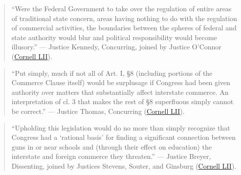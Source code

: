 \documentclass[12pt]{article}
\begin{document}
\begin{quote}
``Were the Federal Government to take over the regulation of entire areas of traditional state concern, areas having nothing to do with the regulation of commercial activities, the boundaries between the spheres of federal and state authority would blur and political responsibility would become illusory.''
--- Justice Kennedy, Concurring, joined by Justice O'Connor (\href{https://www.law.cornell.edu/supct/html/93-1260.ZC.html}{Cornell LII}).
\end{quote}

\begin{quote}
``Put simply, much if not all of Art. I, \S 8 (including portions of the Commerce Clause itself) would be surplusage if Congress had been given authority over matters that substantially affect interstate commerce. An interpretation of cl. 3 that makes the rest of \S 8 superfluous simply cannot be correct.''
--- Justice Thomas, Concurring (\href{https://www.law.cornell.edu/supct/html/93-1260.ZC1.html}{Cornell LII}).
\end{quote}

\begin{quote}
``Upholding this legislation would do no more than simply recognize that Congress had a `rational basis' for finding a significant connection between guns in or near schools and (through their effect on education) the interstate and foreign commerce they threaten.''
--- Justice Breyer, Dissenting, joined by Justices Stevens, Souter, and Ginsburg (\href{https://www.law.cornell.edu/supct/html/93-1260.ZD2.html}{Cornell LII}).
\end{quote}
\end{document}
